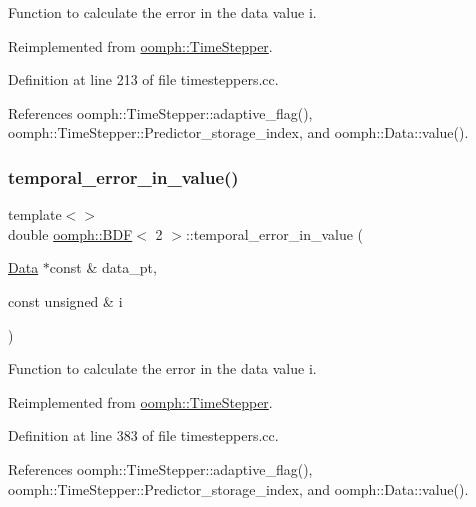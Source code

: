Function to calculate the error in the data value i. 



Reimplemented from \hyperlink{classoomph_1_1TimeStepper_a27f66759f6d9b2040d26918adb998c78}{oomph\+::\+Time\+Stepper}.



Definition at line 213 of file timesteppers.\+cc.



References oomph\+::\+Time\+Stepper\+::adaptive\+\_\+flag(), oomph\+::\+Time\+Stepper\+::\+Predictor\+\_\+storage\+\_\+index, and oomph\+::\+Data\+::value().

\mbox{\label{classoomph_1_1BDF_a315c8cd00516e1e9ff4a0b7954050975}} 
\subsubsection{\texorpdfstring{temporal\+\_\+error\+\_\+in\+\_\+value()}{temporal\_error\_in\_value()}\hspace{0.1cm}{\footnotesize\ttfamily [2/4]}}
{\footnotesize\ttfamily template$<$$>$ \\
double \hyperlink{classoomph_1_1BDF}{oomph\+::\+B\+DF}$<$ 2 $>$\+::temporal\+\_\+error\+\_\+in\+\_\+value (\begin{DoxyParamCaption}\item[{\hyperlink{classoomph_1_1Data}{Data} $\ast$const \&}]{data\+\_\+pt,  }\item[{const unsigned \&}]{i }\end{DoxyParamCaption})\hspace{0.3cm}{\ttfamily [virtual]}}



Function to calculate the error in the data value i. 



Reimplemented from \hyperlink{classoomph_1_1TimeStepper_a27f66759f6d9b2040d26918adb998c78}{oomph\+::\+Time\+Stepper}.



Definition at line 383 of file timesteppers.\+cc.



References oomph\+::\+Time\+Stepper\+::adaptive\+\_\+flag(), oomph\+::\+Time\+Stepper\+::\+Predictor\+\_\+storage\+\_\+index, and oomph\+::\+Data\+::value().

